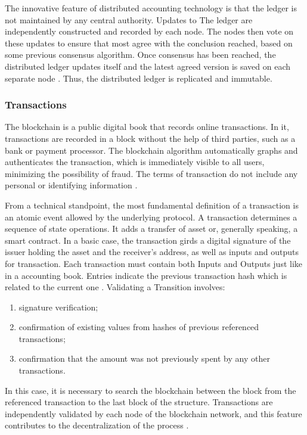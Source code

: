 The innovative feature of distributed accounting technology is that the ledger is not maintained by any central authority. Updates to The ledger are independently constructed and recorded by each node. The nodes then vote on these updates to ensure that most agree with the conclusion reached, based on some previous consensus algorithm. Once consensus has been reached, the distributed ledger updates itself and the latest agreed version is saved on each separate node \cite{swan2015blockchain}. Thus, the distributed ledger is replicated and immutable. 

\subsubsection{Transactions}\label{sec:transac}
The blockchain is a public digital book that records online transactions. In it, transactions are recorded in a block without the help of third parties, such as a bank or payment processor. The blockchain algorithm automatically graphs and authenticates the transaction, which is immediately visible to all users, minimizing the possibility of fraud. The terms of transaction do not include any personal or identifying information \cite{Bankrate2018}.

From a technical standpoint, the most fundamental definition of a transaction is an atomic event allowed by the underlying protocol. A transaction determines a sequence of state operations. It adds a transfer of asset or, generally speaking, a smart contract. In a basic case, the transaction girds a digital signature of the issuer holding the asset and the receiver's address, as well as inputs and outputs for transaction. Each transaction must contain both Inputs and Outputs just like in a accounting book. Entries indicate the previous transaction hash which is related to the current one \cite{greve2018blockchain}. Validating a Transition involves:

\begin{enumerate}
	\item signature verification;
	\item confirmation of existing values from hashes of previous referenced transactions;
	\item confirmation that the amount was not previously spent by any other transactions.
\end{enumerate}

In this case, it is necessary to search the blockchain between the block from the referenced transaction to the last block of the structure. Transactions are independently validated by each node of the blockchain network, and this feature contributes to the decentralization of the process \cite{greve2018blockchain}.

